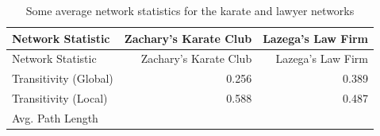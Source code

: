 \documentclass[12pt,twoside]{amherstthesis}
\begin{document}
  \begin{longtable}[]{@{}lrr@{}}
  \caption{Some average network statistics for the karate and lawyer
  networks \label{tab:avgnetstats}}\tabularnewline
  \toprule
  \begin{minipage}[b]{0.29\columnwidth}\raggedright\strut
  Network Statistic\strut
  \end{minipage} & \begin{minipage}[b]{0.29\columnwidth}\raggedleft\strut
  Zachary's Karate Club\strut
  \end{minipage} & \begin{minipage}[b]{0.23\columnwidth}\raggedleft\strut
  Lazega's Law Firm\strut
  \end{minipage}\tabularnewline
  \midrule
  \endfirsthead
  \toprule
  \begin{minipage}[b]{0.29\columnwidth}\raggedright\strut
  Network Statistic\strut
  \end{minipage} & \begin{minipage}[b]{0.29\columnwidth}\raggedleft\strut
  Zachary's Karate Club\strut
  \end{minipage} & \begin{minipage}[b]{0.23\columnwidth}\raggedleft\strut
  Lazega's Law Firm\strut
  \end{minipage}\tabularnewline
  \midrule
  \endhead
  \begin{minipage}[t]{0.29\columnwidth}\raggedright\strut
  Transitivity (Global)\strut
  \end{minipage} & \begin{minipage}[t]{0.29\columnwidth}\raggedleft\strut
  0.256\strut
  \end{minipage} & \begin{minipage}[t]{0.23\columnwidth}\raggedleft\strut
  0.389\strut
  \end{minipage}\tabularnewline
  \begin{minipage}[t]{0.29\columnwidth}\raggedright\strut
  Transitivity (Local)\strut
  \end{minipage} & \begin{minipage}[t]{0.29\columnwidth}\raggedleft\strut
  0.588\strut
  \end{minipage} & \begin{minipage}[t]{0.23\columnwidth}\raggedleft\strut
  0.487\strut
  \end{minipage}\tabularnewline
  \begin{minipage}[t]{0.29\columnwidth}\raggedright\strut
  Avg. Path Length\strut
  \end{minipage} & \begin{minipage}[t]{0.29\columnwidth}\raggedleft\strut

\end{minipage}
\end{longtable}
\end{document}
